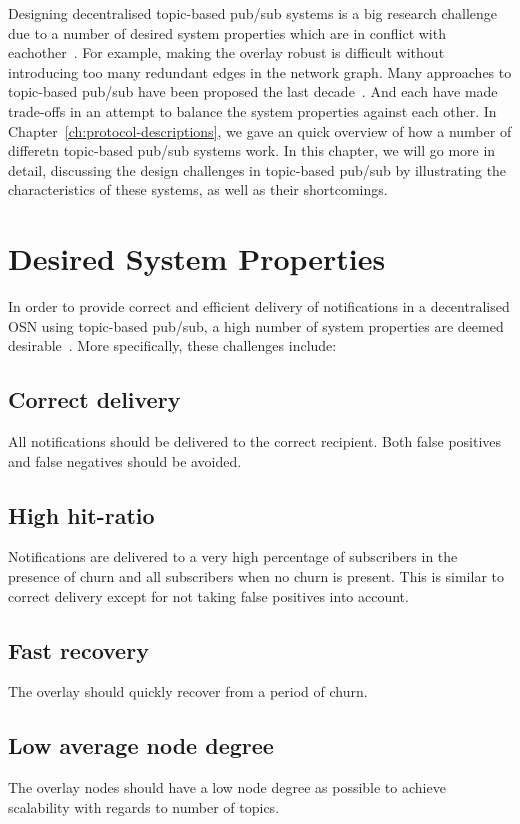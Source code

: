 Designing decentralised topic-based pub/sub systems is a big research
challenge due to a number of desired system properties which are in
conflict with eachother~\cite{Setty:2012}. For example, making the
overlay robust is difficult without introducing too many redundant edges
in the network graph.  Many approaches to topic-based pub/sub have been
proposed the last
decade~\cites{Baehni:2004}{Castro:2002}{Chockler:2007}{Rahimian:2011}{Girdzijauskas:2010}{Matos:2010}{Wong:2008}{Zhuang:2001}.
And each have made trade-offs in an attempt to balance the system
properties against each other. In
Chapter~\ref{ch:protocol-descriptions}, we gave an quick overview of how
a number of differetn topic-based pub/sub systems work.  In this
chapter, we will go more in detail, discussing the design challenges in
topic-based pub/sub by illustrating the characteristics of these
systems, as well as their shortcomings.


\section{Desired System Properties}

In order to provide correct and efficient delivery of notifications in a
decentralised OSN using topic-based pub/sub, a high number of system
properties are deemed desirable~\cite{Setty:2012}. More specifically,
these challenges include:

\subsection{Correct delivery}
All notifications should be delivered to the
correct recipient. Both false positives and false negatives should be
avoided.

\subsection{High hit-ratio}
Notifications are delivered to a very high
percentage of subscribers in the presence of churn and all subscribers
when no churn is present. This is similar to correct delivery except for
not taking false positives into account.

\subsection{Fast recovery}
The overlay should quickly recover from a
period of churn.

\subsection{Low average node degree}
The overlay nodes should have a low
node degree as possible to achieve scalability with regards to number of
topics.

